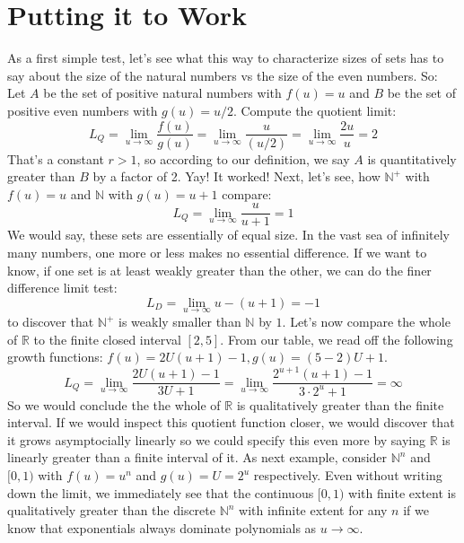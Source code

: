 \documentclass[12pt]{article}
\begin{document}

\section{Putting it to Work}
As a first simple test, let's see what this way to characterize sizes of sets has to say about the size of the natural numbers vs the size of the even numbers. So: Let $A$ be the set of positive natural numbers with $f(u) = u$ and $B$ be the set of positive even numbers with $g(u) = u/2$. Compute the quotient limit: 
\begin{equation}
 L_Q = \lim_{u \rightarrow \infty}	\frac{f(u)}{g(u)}
   	= \lim_{u \rightarrow \infty}	\frac{u}{(u/2)}
   	= \lim_{u \rightarrow \infty}	\frac{2u}{u}     	
   	= 2
\end{equation}
That's a constant $r > 1$, so according to our definition, we say $A$ is quantitatively greater than $B$ by a factor of 2. Yay! It worked! Next, let's see, how $\mathbb{N}^+$ with $f(u) = u$ and $\mathbb{N}$ with $g(u) = u+1$ compare:
\begin{equation}
 L_Q = \lim_{u \rightarrow \infty}	\frac{u}{u+1} = 1
\end{equation}
We would say, these sets are essentially of equal size. In the vast sea of infinitely many numbers, one more or less makes no essential difference. If we want to know, if one set is at least weakly greater than the other, we can do the finer difference limit test:
\begin{equation}
	L_D = \lim_{u \rightarrow \infty} u - (u+1) = -1
\end{equation}
to discover that $\mathbb{N}^+$ is weakly smaller than $\mathbb{N}$ by $1$. Let's now compare the whole of $\mathbb{R}$ to the finite closed interval $[2,5]$. From our table, we read off the following growth functions: $f(u) = 2 U (u+1) - 1, g(u) = (5-2) U +1$.
\begin{equation}
L_Q = \lim_{u \rightarrow \infty} \frac{2 U (u+1) - 1}{3 U +1}
    = \lim_{u \rightarrow \infty} \frac{2^{u+1} (u+1) - 1}{3 \cdot 2^u +1} = \infty	
\end{equation}
So we would conclude the the whole of $\mathbb{R}$ is qualitatively greater than the finite interval. If we would inspect this quotient function closer, we would discover that it grows asymptocially linearly so we could specify this even more by saying  $\mathbb{R}$ is linearly greater than a finite interval of it. As next example, consider $\mathbb{N}^n$ and $[0,1)$ with $f(u) = u^n$ and $g(u) = U = 2^u$ respectively. Even without writing down the limit, we immediately see that the continuous $[0,1)$ with finite extent is qualitatively greater than the discrete $\mathbb{N}^n$ with infinite extent for any $n$ if we know that exponentials always dominate polynomials as $u \rightarrow \infty$.
\end{document}
